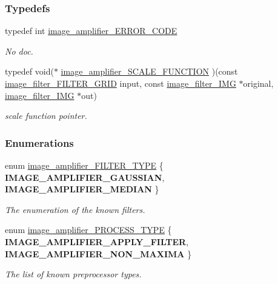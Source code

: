 \subsubsection*{Typedefs}
\begin{DoxyCompactItemize}
\item 
\hypertarget{a00011_a0d1363de9476dc6ae5b800ea4fade103}{typedef int \hyperlink{a00011_a0d1363de9476dc6ae5b800ea4fade103}{image\-\_\-amplifier\-\_\-\-E\-R\-R\-O\-R\-\_\-\-C\-O\-D\-E}}\label{a00011_a0d1363de9476dc6ae5b800ea4fade103}

\begin{DoxyCompactList}\small\item\em No doc. \end{DoxyCompactList}\item 
typedef void($\ast$ \hyperlink{a00011_a1ea386c90cd9638e2f2576d348eb122f}{image\-\_\-amplifier\-\_\-\-S\-C\-A\-L\-E\-\_\-\-F\-U\-N\-C\-T\-I\-O\-N} )(const \hyperlink{a00012_a3d41ec3c203c47ad7dec21ff55acc883}{image\-\_\-filter\-\_\-\-F\-I\-L\-T\-E\-R\-\_\-\-G\-R\-I\-D} input, const \hyperlink{a00004}{image\-\_\-filter\-\_\-\-I\-M\-G} $\ast$original, \hyperlink{a00004}{image\-\_\-filter\-\_\-\-I\-M\-G} $\ast$out)
\begin{DoxyCompactList}\small\item\em scale function pointer. \end{DoxyCompactList}\end{DoxyCompactItemize}
\subsubsection*{Enumerations}
\begin{DoxyCompactItemize}
\item 
enum \hyperlink{a00011_ab9ab1f07cda00e3ff3333457d61d7cca}{image\-\_\-amplifier\-\_\-\-F\-I\-L\-T\-E\-R\-\_\-\-T\-Y\-P\-E} \{ {\bfseries I\-M\-A\-G\-E\-\_\-\-A\-M\-P\-L\-I\-F\-I\-E\-R\-\_\-\-G\-A\-U\-S\-S\-I\-A\-N}, 
{\bfseries I\-M\-A\-G\-E\-\_\-\-A\-M\-P\-L\-I\-F\-I\-E\-R\-\_\-\-M\-E\-D\-I\-A\-N}
 \}
\begin{DoxyCompactList}\small\item\em The enumeration of the known filters. \end{DoxyCompactList}\item 
enum \hyperlink{a00011_a6409b55393af13a405538b966d80ec1d}{image\-\_\-amplifier\-\_\-\-P\-R\-O\-C\-E\-S\-S\-\_\-\-T\-Y\-P\-E} \{ {\bfseries I\-M\-A\-G\-E\-\_\-\-A\-M\-P\-L\-I\-F\-I\-E\-R\-\_\-\-A\-P\-P\-L\-Y\-\_\-\-F\-I\-L\-T\-E\-R}, 
{\bfseries I\-M\-A\-G\-E\-\_\-\-A\-M\-P\-L\-I\-F\-I\-E\-R\-\_\-\-N\-O\-N\-\_\-\-M\-A\-X\-I\-M\-A}
 \}
\begin{DoxyCompactList}\small\item\em The list of known preprocessor types. \end{DoxyCompactList}\end{DoxyCompactItemize}
